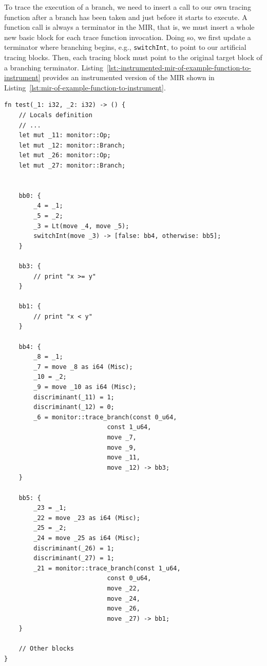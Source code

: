 \documentclass{article}
\begin{document}
To trace the execution of a branch, we need to insert a call to our own tracing function after a branch has been taken and just before it starts to execute. A function call is always a terminator in the \ac{MIR}, that is, we must insert a whole new basic block for each trace function invocation. Doing so, we first update a terminator where branching begins, e.g., \lstinline{switchInt}, to point to our artificial tracing blocks. Then, each tracing block must point to the original target block of a branching terminator. Listing~\ref{lst:-instrumented-mir-of-example-function-to-instrument} provides an instrumented version of the \ac{MIR} shown in Listing~\ref{lst:mir-of-example-function-to-instrument}.
\begin{lstlisting}[language={}, style=boxed, caption={Instrumented MIR of the \lstinline{foo} function}, label=lst:-instrumented-mir-of-example-function-to-instrument]
fn test(_1: i32, _2: i32) -> () {
    // Locals definition
    // ...
    let mut _11: monitor::Op;
    let mut _12: monitor::Branch;
    let mut _26: monitor::Op;
    let mut _27: monitor::Branch;


    bb0: {
        _4 = _1;
        _5 = _2;
        _3 = Lt(move _4, move _5);
        switchInt(move _3) -> [false: bb4, otherwise: bb5];
    }

    bb3: {
        // print "x >= y"
    }

    bb1: {
        // print "x < y"
    }

    bb4: {
        _8 = _1;
        _7 = move _8 as i64 (Misc);
        _10 = _2;
        _9 = move _10 as i64 (Misc);
        discriminant(_11) = 1;
        discriminant(_12) = 0;
        _6 = monitor::trace_branch(const 0_u64,
                            const 1_u64,
                            move _7,
                            move _9,
                            move _11,
                            move _12) -> bb3;
    }

    bb5: {
        _23 = _1;
        _22 = move _23 as i64 (Misc);
        _25 = _2;
        _24 = move _25 as i64 (Misc);
        discriminant(_26) = 1;
        discriminant(_27) = 1;
        _21 = monitor::trace_branch(const 1_u64,
                            const 0_u64,
                            move _22,
                            move _24,
                            move _26,
                            move _27) -> bb1;
    }

    // Other blocks
}
\end{lstlisting}
\end{document}
